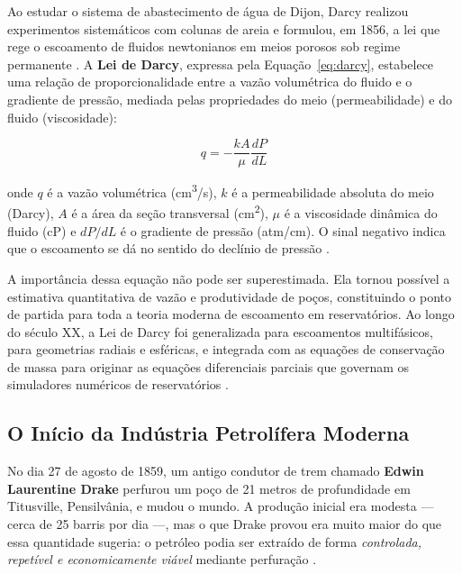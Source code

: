 \documentclass[
  12pt,
  a4paper,
  oneside,
  brazilian,
  sumario=tradicional
]{abntex2}
\begin{document}
Ao estudar o sistema de abastecimento de água de Dijon, Darcy realizou
experimentos sistemáticos com colunas de areia e formulou, em 1856,
a lei que rege o escoamento de fluidos newtonianos em meios porosos
sob regime permanente \cite{dake2014, rosa2006}. A
\textbf{Lei de Darcy}, expressa pela Equação~\ref{eq:darcy},
estabelece uma relação de proporcionalidade entre a vazão volumétrica
do fluido e o gradiente de pressão, mediada pelas propriedades do meio
(permeabilidade) e do fluido (viscosidade):

\begin{equation}
  q = -\frac{kA}{\mu}\frac{dP}{dL}
  \label{eq:darcy}
\end{equation}

\noindent onde $q$ é a vazão volumétrica (cm\textsuperscript{3}/s),
$k$ é a permeabilidade absoluta do meio (Darcy), $A$ é a área da
seção transversal (cm\textsuperscript{2}), $\mu$ é a viscosidade
dinâmica do fluido (cP) e $dP/dL$ é o gradiente de pressão
(atm/cm). O sinal negativo indica que o escoamento se dá no sentido
do declínio de pressão \cite{rosa2006}.

A importância dessa equação não pode ser superestimada. Ela tornou
possível a estimativa quantitativa de vazão e produtividade de poços,
constituindo o ponto de partida para toda a teoria moderna de
escoamento em reservatórios. Ao longo do século XX, a Lei de Darcy
foi generalizada para escoamentos multifásicos, para geometrias
radiais e esféricas, e integrada com as equações de conservação de
massa para originar as equações diferenciais parciais que governam
os simuladores numéricos de reservatórios \cite{alyafei2019, rosa2006}.

\subsection{O Início da Indústria Petrolífera Moderna}

No dia 27 de agosto de 1859, um antigo condutor de trem chamado
\textbf{Edwin Laurentine Drake} perfurou um poço de 21 metros de
profundidade em Titusville, Pensilvânia, e mudou o mundo. A produção
inicial era modesta — cerca de 25 barris por dia —, mas o que Drake
provou era muito maior do que essa quantidade sugeria: o petróleo
podia ser extraído de forma \textit{controlada, repetível e
economicamente viável} mediante perfuração \cite{yergin1991}.
\end{document}
